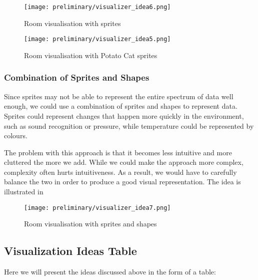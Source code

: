 \documentclass[../document]{subfiles}
\begin{document}
\begin{figure}
	\texttt{[image: preliminary/visualizer\_idea6.png]}
	\caption{Room visualisation with sprites}
	\label{fig:visualizer_idea6}
\end{figure}

\begin{figure}
	\texttt{[image: preliminary/visualizer\_idea5.png]}
	\caption{Room visualisation with Potato Cat sprites}
	\label{fig:visualizer_idea5}
\end{figure}

\subsubsection{Combination of Sprites and Shapes}

Since sprites may not be able to represent the entire spectrum of data well enough, we could use a combination of sprites and shapes to represent data. Sprites could represent changes that happen more quickly in the environment, such as sound recognition or pressure, while temperature could be represented by colours.

The problem with this approach is that it becomes less intuitive and more cluttered the more we add. While we could make the approach more complex, complexity often hurts intuitiveness. As a result, we would have to carefully balance the two in order to produce a good visual representation. The idea is illustrated in 

\begin{figure}
\texttt{[image: preliminary/visualizer\_idea7.png]}
\caption{Room visualisation with sprites and shapes}
\label{fig:visualizer_idea7}
\end{figure}

\subsection{Visualization Ideas Table}
Here we will present the ideas discussed above in the form of a table:
\end{document}
